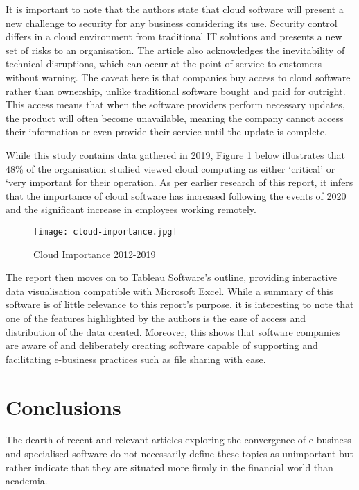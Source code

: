 \documentclass[12pt]{article}
\begin{document}
It is important to note that the authors state that cloud software will present a new challenge to security for any business considering its use. Security control differs in a cloud environment from traditional IT solutions and presents a new set of risks to an organisation. The article also acknowledges the inevitability of technical disruptions, which can occur at the point of service to customers without warning. The caveat here is that companies buy access to cloud software rather than ownership, unlike traditional software bought and paid for outright. This access means that when the software providers perform necessary updates, the product will often become unavailable, meaning the company cannot access their information or even provide their service until the update is complete. \par 

While this study contains data gathered in 2019, Figure \ref{fig:cloud} below illustrates that 48\% of the organisation studied viewed cloud computing as either ‘critical’ or ‘very important for their operation.  As per earlier research of this report, it infers that the importance of cloud software has increased following the events of 2020 and the significant increase in employees working remotely. \par 

\vspace{0.5cm}
\begin{figure}[H]
    \centering
    \texttt{[image: cloud-importance.jpg]}
    \caption{Cloud Importance 2012-2019 \cite{mihalcescu}}
    \label{fig:cloud}
\end{figure}

The report then moves on to Tableau Software’s outline, providing interactive data visualisation compatible with Microsoft Excel. While a summary of this software is of little relevance to this report’s purpose, it is interesting to note that one of the features highlighted by the authors is the ease of access and distribution of the data created. Moreover, this shows that software companies are aware of and deliberately creating software capable of supporting and facilitating e-business practices such as file sharing with ease. \par


\section{Conclusions}
The dearth of recent and relevant articles exploring the convergence of e-business and specialised software do not necessarily define these topics as unimportant but rather indicate that they are situated more firmly in the financial world than academia. \par 
\end{document}
